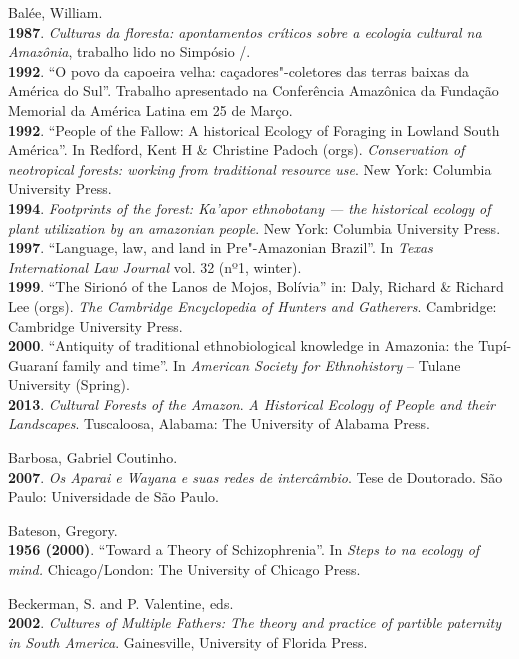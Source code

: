 \begin{Parskip}
Balée, William.\\
\textbf{1987}. \emph{Culturas da floresta: apontamentos críticos sobre a
ecologia cultural na Amazônia}, trabalho lido no Simpósio /.\\
\textbf{1992}. ``O povo da capoeira velha: caçadores"-coletores das
terras baixas da América do Sul''. Trabalho apresentado na Conferência
Amazônica da Fundação Memorial da América Latina em 25 de Março.\\
\textbf{1992}. ``People of the Fallow: A historical Ecology of Foraging
in Lowland South América''. In Redford, Kent H \& Christine Padoch
(orgs). \emph{Conservation of neotropical forests: working from
traditional resource use}. New York: Columbia University Press.\\
\textbf{1994}. \emph{Footprints of the forest: Ka'apor ethnobotany ---
the historical ecology of plant utilization by an amazonian people}. New
York: Columbia University Press.\\
\textbf{1997}. ``Language, law, and land in Pre"-Amazonian Brazil''. In
\emph{Texas International Law Journal} vol. 32 (nº1, winter).\\
\textbf{1999}. ``The Sirionó of the Lanos de Mojos, Bolívia'' in: Daly, Richard
\& Richard Lee (orgs). \emph{The Cambridge Encyclopedia of Hunters and
Gatherers}. Cambridge: Cambridge University Press.\\
\textbf{2000}. ``Antiquity of traditional ethnobiological knowledge in
Amazonia: the Tupí-Guaraní family and time''. In \emph{American Society
for Ethnohistory} -- Tulane University (Spring).\\
\textbf{2013}. \emph{Cultural Forests of the Amazon}. \emph{A Historical
Ecology of People and their Landscapes}. Tuscaloosa, Alabama: The
University of Alabama Press.

Barbosa, Gabriel Coutinho.\\
\textbf{2007}. \emph{Os Aparai e Wayana e suas redes de intercâmbio}.
Tese de Doutorado. São Paulo: Universidade de São Paulo.

Bateson, Gregory.\\
\textbf{1956 (2000)}. ``Toward a Theory of Schizophrenia''. In
\emph{Steps to na ecology of mind.} Chicago/London: The University of
Chicago Press.

Beckerman, S. and P. Valentine, eds.\\
\textbf{2002}. \emph{Cultures of Multiple Fathers: The theory and
practice of partible paternity in South America}. Gainesville,
University of Florida Press.


\end{Parskip}
